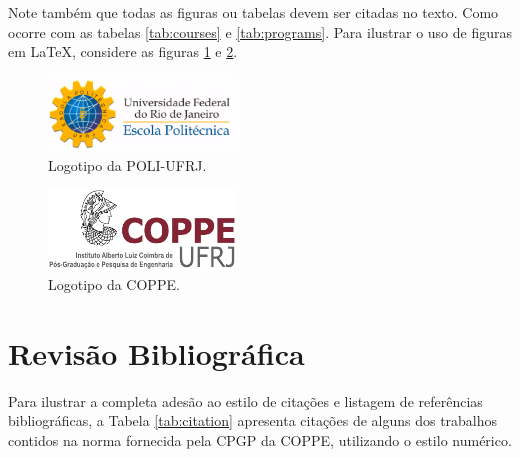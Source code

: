\documentclass[grad,numbers]{coppe}
\begin{document}
  
  Note também que todas as figuras ou tabelas devem ser citadas no texto. Como ocorre com as tabelas \ref{tab:courses} e \ref{tab:programs}. Para ilustrar o uso de figuras em \LaTeX, considere as figuras \ref{fig:poli} e \ref{fig:coppe}.
  
  \begin{figure}
  	\centering
  	\includegraphics[width=5cm]{poli-logo.pdf}
  	\caption{Logotipo da POLI-UFRJ.}
  	\label{fig:poli}
  \end{figure}
  
  \begin{figure}
  	\centering
  	\includegraphics[width=5cm]{coppe-logo.pdf}
  	\caption{Logotipo da COPPE.}
  	\label{fig:coppe}
  \end{figure}
  
  \chapter{Revisão Bibliográfica}

  Para ilustrar a completa adesão ao estilo de citações e listagem de
  referências bibliográficas, a Tabela \ref{tab:citation} apresenta citações de alguns dos trabalhos contidos na norma fornecida pela CPGP da
  COPPE, utilizando o estilo numérico.
\end{document}
